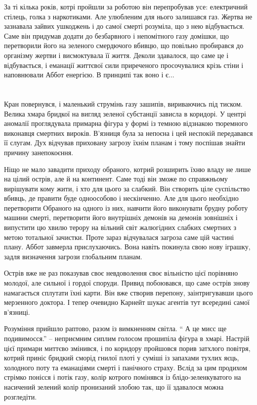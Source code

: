 \documentclass[a4paper,oneside]{book}
\begin{document}
За ті кілька років, котрі пройшли за роботою він перепробував усе: електричний
стілець, голка з наркотиками. Але улюбленим для нього залишався газ. Жертва не
зазнавала зайвих ушкоджень і до самої смерті розуміла, що з нею
відбувається. Саме він придумав додати до безбарвного і непомітного газу
домішки, що перетворили його на зеленого смердючого вбивцю, що повільно
пробирався до організму жертви і висмоктувала її життя. Деколи здавалося, що
саме це і відбувається, і еманації життєвої сили приреченого просочувалися
крізь стіни і наповнювали Аббот енергією. В принципі так воно і є...

\section*{}

Кран повернувся, і маленький струмінь газу зашипів, вириваючись під
тиском. Велика хмара бридкої на вигляд зеленої субстанції зависла в
коридорі. У центрі аномалії проглядувала примарна фігура у формі із темною
відзнакою тюремного виконавця смертних вироків. В’язниця була за непоєна і цей
неспокій передавався її слугам. Дух відчував приховану загрозу їхнім планам і
тому поспішав знайти причину занепокоєння.

Ніщо не мало завадити приходу обраного, котрий розширить їхню владу не лише на
цілий острів, але й на континент. Саме тоді він зможе по справжньому
вирішувати кому жити, і хто для цього за слабкий. Він створить ціле
суспільство вбивць, де правити буде одноособово і нескінченно. Але для цього
необхідно перетворити Обраного на одного із них, навчити його виконувати
брудну роботу машини смерті, перетворити його внутрішніх демонів на демонів
зовнішніх і випустити цю хвилю терору на вільний світ жалюгідних слабких
смертних з метою тотальної зачистки. Проте зараз відчувалася загроза саме цій
частині плану. Аббот завмерла прислухаючись. Вона навіть покинула свою нову
іграшку, задля визначення загрози глобальним планам.

Острів вже не раз показував своє невдоволення своє вільністю цієї порівняно
молодої, але сильної і гордої споруди. Привид побоювався, що саме острів знову
намагається сплутати їхні карти. Він вже створив перепону, заінтригувавши
цього мерзенного доктора. І тепер очевидно Карнейт шукає агентів тут всередині
самої в’язниці.

Розуміння прийшло раптово, разом із вимкненням світла. “ А це мисс ще
подивимосся.” – неприємним сиплим голосом прошипіла фігура в хмарі. Настрій
цієї примари миттєво змінився, і по коридору пройшовся порив затхлого повітря,
котрий приніс бридкий сморід гнилої плоті  у суміші із запахами тухлих яєць,
холодного поту та еманаціями смерті і панічного страху. Вслід за цим продихом
стрімко понісся і потік газу, колір котрого помінявся із блідо-зеленкуватого
на насичений зелений колір пронизаний злобою так, що її здавалося можна
розгледіти.
\end{document}
